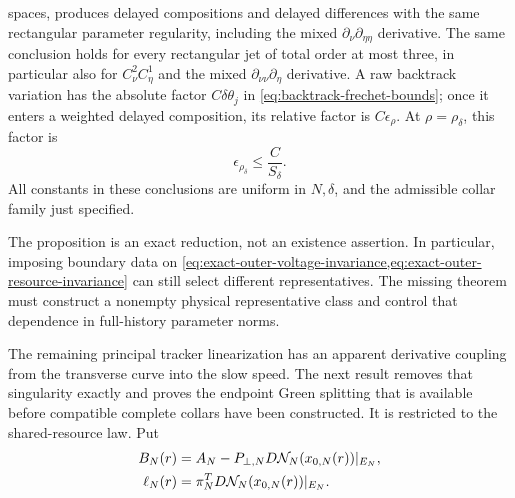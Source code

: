 \begin{proposition}
spaces, produces delayed compositions and delayed differences with the same
rectangular parameter regularity, including the mixed
\(\partial_\nu\partial_{\eta\eta}\) derivative.  The same conclusion holds
for every rectangular jet of total order at most three, in particular also
for \(C^2_\nu C^1_\eta\) and the mixed
\(\partial_{\nu\nu}\partial_\eta\) derivative.  A raw backtrack variation has
the absolute factor \(C\delta\theta_j\) in
\cref{eq:backtrack-frechet-bounds}; once it enters a weighted delayed
composition, its relative factor is \(C\epsilon_\rho\).  At
\(\rho=\rho_\delta\), this factor is
\begin{equation}
 \epsilon_{\rho_\delta}\le\frac{C}{S_\delta}.       \label{eq:backtrack-logarithmic-loss}
\end{equation}
All constants in these conclusions are uniform in \(N,\delta\), and the
admissible collar family just specified.
\end{proposition}

The proposition is an exact reduction, not an existence assertion.
In particular, imposing boundary data on
\cref{eq:exact-outer-voltage-invariance,eq:exact-outer-resource-invariance}
can still select different representatives.  The missing theorem must
construct a nonempty physical representative class and control that
dependence in full-history parameter norms.

The remaining principal tracker linearization has an apparent derivative
coupling from the transverse curve into the slow speed.  The next result
removes that singularity exactly and proves the endpoint Green splitting
that is available before compatible complete collars have been constructed.
It is restricted to the shared-resource law.  Put
\begin{align}
 B_N(r)
 &=A_N-P_{\perp,N}D\mathcal N_N(x_{0,N}(r))|_{E_N},\notag\\
 \ell_N(r)
 &=\pi_N^TD\mathcal N_N(x_{0,N}(r))|_{E_N}.        \label{eq:principal-tracker-coefficients}
\end{align}

